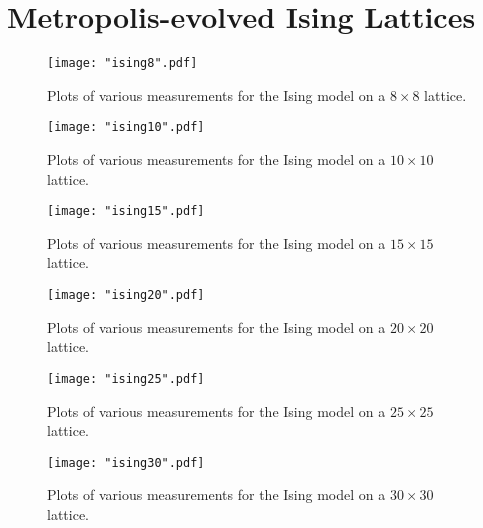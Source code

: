 \documentclass[twocolumn,aps]{revtex4-1} %
\begin{document}
\section{Metropolis-evolved Ising Lattices}
\begin{figure*}
	\texttt{[image: "ising8".pdf]}
	\caption{\label{fig:ising8} Plots of various measurements for the Ising model on a $8 \times 8 $ lattice.}
\end{figure*}
\begin{figure*}
	\texttt{[image: "ising10".pdf]}
	\caption{\label{fig:ising10} Plots of various measurements for the Ising model on a $10 \times 10 $ lattice.}
\end{figure*}
\begin{figure*}
	\texttt{[image: "ising15".pdf]}
	\caption{\label{fig:ising15} Plots of various measurements for the Ising model on a $15 \times 15 $ lattice.}
\end{figure*}
\begin{figure*}
	\texttt{[image: "ising20".pdf]}
	\caption{\label{fig:ising20} Plots of various measurements for the Ising model on a $20 \times 20 $ lattice.}
\end{figure*}
\begin{figure*}
	\texttt{[image: "ising25".pdf]}
	\caption{\label{fig:ising25} Plots of various measurements for the Ising model on a $25 \times 25 $ lattice.}
\end{figure*}
\begin{figure*}
	\texttt{[image: "ising30".pdf]}
	\caption{\label{fig:ising30} Plots of various measurements for the Ising model on a $30 \times 30 $ lattice.}
\end{figure*}
\clearpage
\end{document}
